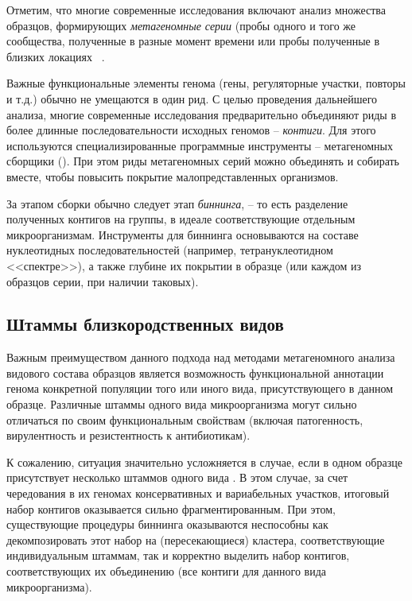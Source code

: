 \documentclass{spbau-diploma}
\begin{document}
Отметим, что многие современные исследования включают анализ множества образцов, формирующих \textit{метагеномные серии} (пробы одного и того же сообщества, полученные в разные момент времени \cite{time_series} или пробы полученные в близких локациях ~\cite{spacial_series_1, spacial_series_2}.

Важные функциональные элементы генома (гены, регуляторные участки, повторы и т.д.) обычно не умещаются в один рид. 
С целью проведения дальнейшего анализа, многие современные исследования предварительно объединяют риды в более длинные последовательности исходных геномов -- \textit{контиги}. Для этого используются специализированные программные инструменты -- метагеномных сборщики (\cite{IDBA-UD, MEGAHIT, MetaVelvet, RayMeta, MetaSpades}). При этом риды метагеномных серий можно объединять и собирать вместе, чтобы повысить покрытие малопредставленных организмов. 

За этапом сборки обычно следует этап \textit{биннинга}, -- то есть разделение полученных контигов на группы, в идеале соответствующие отдельным микроорганизмам. Инструменты для биннинга \cite{CONCOCT, GroopM, MyCC, MetaBAT} основываются на составе нуклеотидных последовательностей (например, тетрануклеотидном <<спектре>>), а также глубине их покрытии в образце (или каждом из образцов серии, при наличии таковых). 


\subsection{Штаммы близкородственных видов}


Важным преимуществом данного подхода над методами метагеномного анализа видового состава образцов является возможность функциональной аннотации генома конкретной популяции того или иного вида, присутствующего в данном образце. Различные штаммы одного вида микроорганизма могут сильно отличаться по своим функциональным свойствам (включая патогенность, вирулентность и резистентность к антибиотикам).

К сожалению, ситуация значительно усложняется  в случае, если в одном образце присутствует несколько штаммов одного вида \cite{StrainEst, metasub, infant_gut}.
В этом случае, за счет чередования в их геномах консервативных и вариабельных участков, итоговый набор контигов оказывается сильно фрагментированным. При этом, существующие процедуры биннинга оказываются неспособны как декомпозировать этот набор на (пересекающиеся) кластера, соответствующие индивидуальным штаммам, так и корректно выделить набор контигов, соответствующих их объединению (все контиги для данного вида микроорганизма).
\end{document}
